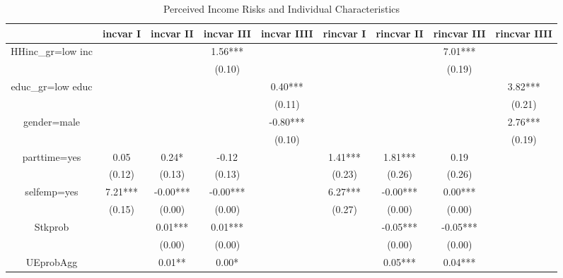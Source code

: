 \documentclass[12pt,notitlepage,onecolumn,aps,pra]{article}
\begin{document}
\begin{table}[p]
\centering
\begin{adjustbox}{width={0.9\textwidth}}
\begin{threeparttable}
\caption{Perceived Income Risks and Individual Characteristics}
\label{micro_reg}
\begin{tabular}{ccccccccc}
\hline 
{} & incvar I & incvar II & incvar III & incvar IIII & rincvar I & rincvar II & rincvar III & rincvar IIII \\
\hline 
HHinc\_gr=low inc &          &           &    1.56*** &             &           &            &     7.01*** &              \\
                 &          &           &     (0.10) &             &           &            &      (0.19) &              \\
educ\_gr=low educ &          &           &            &     0.40*** &           &            &             &      3.82*** \\
                 &          &           &            &      (0.11) &           &            &             &       (0.21) \\
gender=male      &          &           &            &    -0.80*** &           &            &             &      2.76*** \\
                 &          &           &            &      (0.10) &           &            &             &       (0.19) \\
parttime=yes     &     0.05 &     0.24* &      -0.12 &             &   1.41*** &    1.81*** &        0.19 &              \\
                 &   (0.12) &    (0.13) &     (0.13) &             &    (0.23) &     (0.26) &      (0.26) &              \\
selfemp=yes      &  7.21*** &  -0.00*** &   -0.00*** &             &   6.27*** &   -0.00*** &     0.00*** &              \\
                 &   (0.15) &    (0.00) &     (0.00) &             &    (0.27) &     (0.00) &      (0.00) &              \\
Stkprob          &          &   0.01*** &    0.01*** &             &           &   -0.05*** &    -0.05*** &              \\
                 &          &    (0.00) &     (0.00) &             &           &     (0.00) &      (0.00) &              \\
UEprobAgg        &          &    0.01** &      0.00* &             &           &    0.05*** &     0.04*** &              \\

\end{tabular}
\end{threeparttable}
\end{adjustbox}
\end{table}
\end{document}
